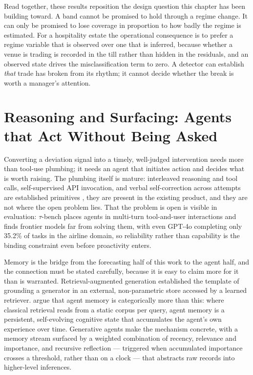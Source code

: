 Read together, these results reposition the design question this chapter has
been building toward. A band cannot be promised to hold through a regime
change. It can only be promised to lose coverage in proportion to how badly
the regime is estimated. For a hospitality estate the operational consequence
is to prefer a regime variable that is observed over one that is inferred,
because whether a venue is trading is recorded in the till rather than hidden
in the residuals, and an observed state drives the misclassification term to
zero. A detector can establish \emph{that} trade has broken from its rhythm;
it cannot decide whether the break is worth a manager's attention.

\section{Reasoning and Surfacing: Agents that Act Without Being Asked}
\label{sec:rw-surfacing}

Converting a deviation signal into a timely, well-judged intervention needs
more than tool-use plumbing; it needs an agent that initiates action and
decides what is worth raising. The plumbing itself is mature: interleaved
reasoning and tool calls, self-supervised API invocation, and verbal
self-correction across attempts are established primitives
\citep{yao_react_2022,schick_toolformer_2023,shinn_reflexion_2023}, they are
present in the existing product, and they are not where the open problem lies.
That the problem is open is visible in evaluation: $\tau$-bench
\citep{yao_-bench_2024} places agents in multi-turn tool-and-user interactions
and finds frontier models far from solving them, with even GPT-4o completing
only 35.2\% of tasks in the airline domain, so reliability rather than
capability is the binding constraint even before proactivity enters.

Memory is the bridge from the forecasting half of this work to the agent half,
and the connection must be stated carefully, because it is easy to claim more
for it than is warranted. Retrieval-augmented generation
\citep{lewis_retrieval-augmented_2020} established the template of grounding a
generator in an external, non-parametric store accessed by a learned
retriever. \citet{hu_memory_2026} argue that agent memory is categorically more
than this: where classical retrieval reads from a static corpus per query,
agent memory is a persistent, self-evolving cognitive state that accumulates
the agent's own experience over time. Generative agents
\citep{park_generative_2023} make the mechanism concrete, with a memory stream
surfaced by a weighted combination of recency, relevance and importance, and
recursive reflection --- triggered when accumulated importance crosses a
threshold, rather than on a clock --- that abstracts raw records into
higher-level inferences.


